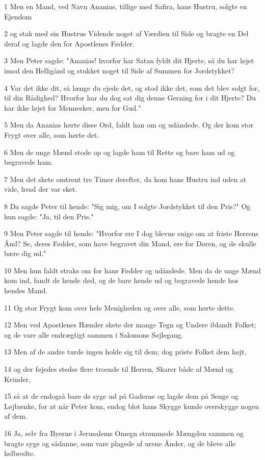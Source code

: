 \par 1 Men en Mand, ved Navn Ananias, tillige med Safira, hans Hustru, solgte en Ejendom
\par 2 og stak med sin Hustrus Vidende noget af Værdien til Side og bragte en Del deraf og lagde den for Apostlenes Fødder.
\par 3 Men Peter sagde: "Ananias! hvorfor har Satan fyldt dit Hjerte, så du har løjet imod den Helligånd og stukket noget til Side af Summen for Jordstykket?
\par 4 Var det ikke dit, så længe du ejede det, og stod ikke det, som det blev solgt for, til din Rådighed? Hvorfor har du dog sat dig denne Gerning for i dit Hjerte? Du har ikke løjet for Mennesker, men for Gud."
\par 5 Men da Ananias hørte disse Ord, faldt han om og udåndede. Og der kom stor Frygt over alle, som hørte det.
\par 6 Men de unge Mænd stode op og lagde ham til Rette og bare ham ud og begravede ham.
\par 7 Men det skete omtrent tre Timer derefter, da kom hans Hustru ind uden at vide, hvad der var sket.
\par 8 Da sagde Peter til hende: "Sig mig, om I solgte Jordstykket til den Pris?" Og hun sagde: "Ja, til den Pris."
\par 9 Men Peter sagde til hende: "Hvorfor ere I dog blevne enige om at friste Herrens Ånd? Se, deres Fødder, som have begravet din Mand, ere for Døren, og de skulle bære dig ud."
\par 10 Men hun faldt straks om for hans Fødder og udåndede. Men da de unge Mænd kom ind, fandt de hende død, og de bare hende ud og begravede hende hos hendes Mand.
\par 11 Og stor Frygt kom over hele Menigheden og over alle, som hørte dette.
\par 12 Men ved Apostlenes Hænder skete der mange Tegn og Undere iblandt Folket; og de vare alle endrægtigt sammen i Salomons Søjlegang.
\par 13 Men af de andre turde ingen holde sig til dem; dog priste Folket dem højt,
\par 14 og der føjedes stedse flere troende til Herren, Skarer både af Mænd og Kvinder,
\par 15 så at de endogså bare de syge ud på Gaderne og lagde dem på Senge og Løjbænke, for at når Peter kom, endog blot hans Skygge kunde overskygge nogen af dem.
\par 16 Ja, selv fra Byerne i Jerusalems Omegn strømmede Mængden sammen og bragte syge og sådanne, som vare plagede af urene Ånder, og de bleve alle helbredte.
